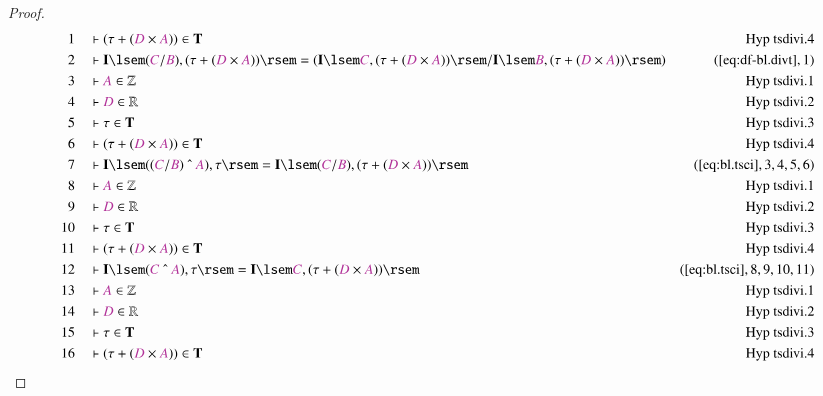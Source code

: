 \begin{proof}
\begin{align}
  1 &&  & \vdash ( \tau + ( \mc{D} \times \mc{A} ) ) \in
      \mathbf{T}&\text{Hyp~tsdivi.4}\notag%
  \\ 2 &&  & \vdash \mathbf{I} \lsem ( \mc{C} / \mc{B} ) , ( \tau + ( \mc{D}
      \times \mc{A} ) ) \rsem = ( \mathbf{I} \lsem \mc{C} ,
      ( \tau + ( \mc{D} \times \mc{A} ) ) \rsem / \mathbf{I}
      \lsem \mc{B} , ( \tau + ( \mc{D} \times \mc{A} ) )
      \rsem )&(\mbox{\ref{eq:df-bl.divt}},1)\notag
  \\ 3 &&  & \vdash \mc{A} \in \mathbb{Z}&\text{Hyp~tsdivi.1}\notag%
  \\ 4 &&  & \vdash \mc{D} \in \mathbb{R}&\text{Hyp~tsdivi.2}\notag%
  \\ 5 &&  & \vdash \tau \in \mathbf{T}&\text{Hyp~tsdivi.3}\notag%
  \\ 6 &&  & \vdash ( \tau + ( \mc{D} \times \mc{A} ) ) \in
      \mathbf{T}&\text{Hyp~tsdivi.4}\notag%
  \\ 7 &&  & \vdash \mathbf{I} \lsem ( ( \mc{C} / \mc{B} ) ~\string^~ \mc{A} )
      , \tau \rsem = \mathbf{I} \lsem ( \mc{C} / \mc{B} ) ,
      ( \tau + ( \mc{D} \times \mc{A} ) )
      \rsem&(\mbox{\ref{eq:bl.tsci}},3,4,5,6)\notag
  \\ 8 &&  & \vdash \mc{A} \in \mathbb{Z}&\text{Hyp~tsdivi.1}\notag%
  \\ 9 &&  & \vdash \mc{D} \in \mathbb{R}&\text{Hyp~tsdivi.2}\notag%
  \\ 10 &&  & \vdash \tau \in \mathbf{T}&\text{Hyp~tsdivi.3}\notag%
  \\ 11 &&  & \vdash ( \tau + ( \mc{D} \times \mc{A} ) ) \in
      \mathbf{T}&\text{Hyp~tsdivi.4}\notag%
  \\ 12 &&  & \vdash \mathbf{I} \lsem ( \mc{C} ~\string^~ \mc{A} ) , \tau \rsem
      = \mathbf{I} \lsem \mc{C} , ( \tau + ( \mc{D} \times
      \mc{A} ) )
      \rsem&(\mbox{\ref{eq:bl.tsci}},8,9,10,11)\notag
  \\ 13 &&  & \vdash \mc{A} \in
      \mathbb{Z}&\text{Hyp~tsdivi.1}\notag%
  \\ 14 &&  & \vdash \mc{D} \in
      \mathbb{R}&\text{Hyp~tsdivi.2}\notag%
  \\ 15 &&  & \vdash \tau \in \mathbf{T}&\text{Hyp~tsdivi.3}\notag%
  \\ 16 &&  & \vdash ( \tau + ( \mc{D} \times \mc{A} ) ) \in
      \mathbf{T}&\text{Hyp~tsdivi.4}\notag%

\end{align}
\end{proof}
